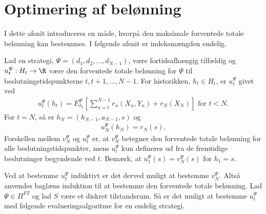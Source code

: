\section{Optimering af belønning}
I dette afsnit introduceres en måde, hvorpå den maksimale forventede totale belønning kan bestemmes. I følgende afsnit er indeksmængden endelig. 

Lad en strategi, $\Psi = (d_1,d_2, \ldots, d_{N-1})$, være fortidsafhængig tilfældig og $u_t^\Psi: H_t \to \R$ være den forventede totale belønning for $\Psi$ til beslutningstidspunkterne $t, t+1, \ldots, N-1$. For historikken, $h_t \in H_t$, er $u_t^\Psi$ givet ved 
% 
\begin{align}\label{eq:forventede_totale_belønning} 
    u_t^{\Psi}(h_t)=E^{\Psi}_{h_t}\left[\sum^{N-1}_{n=t}r_n(X_n, Y_n)+r_N(X_N)\right] \text{ for } t < N. 
\end{align}
For $t=N$, så er $h_N=(h_{N-1},a_{N-1},s)$ og
\begin{align}\label{eq:u_N=r_N}
    u_N^{\Psi}(h_N)=r_N(s). 
\end{align}
Forskellen mellem $v_N^\Psi$ og $u_t^\Psi$ er, at $v_N^\Psi$ betegner den forventede totale belønning for alle beslutningstidspunkter, mens $u_t^\Psi$ kun defineres ud fra de fremtidige beslutninger begyndende ved $t$. Bemærk, at $u_1^\Psi(s) = v_N^\Psi(s)$ for $h_1 = s$. 


Ved at bestemme $u_t^{\Psi}$ induktivt er det derved muligt at bestemme $v_N^\Psi$. Altså anvendes baglæns induktion til at bestemme den forventede totale belønning. 
Lad $\Psi\in \Pi^{FT}$ og lad $S$ være et diskret tilstandsrum. Så er det muligt at bestemme $u_t^\Psi$ med følgende evalueringsalgoritme for en endelig strategi. %

